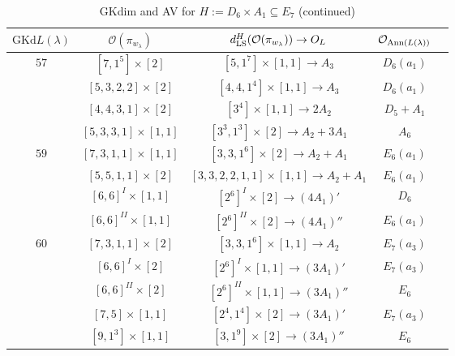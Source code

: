 \documentclass[reqno,12pt]{amsart}
\numberwithin{equation}{section}
\theoremstyle{plain}
\theoremstyle{definition}
\newcommand{\lam}{\lambda}
\renewcommand{\subset}{\subseteq}
\begin{document}
\begin{table}[htbp]\caption{ GKdim and AV for $H:=D_6\times A_1\subset E_7$ (continued)}
	\centering
	\renewcommand{\arraystretch}{1.5}
	\setlength\tabcolsep{5pt}
{	\begin{tabular}{|c|c|c|c|c|}
		\hline $\mathrm{GKd} L(\lambda)$ &   $\mathcal{O}({\pi_{w_{\lam}}})$& $d_{\rm LS}^{H}(\mathcal{O}(\pi_{w_\lambda}))\rightarrow O_{L}$ & $\mathcal{O}_{{\rm Ann}(L(\lambda))}$ \\ \hline

$57$ 
&  $ [7,1^5]\times [2]$  & \small{$[5,1^7]\times [1,1]\rightarrow  A_3$  }&   $D_6(a_1)$ \\
&  $ [5,3,2,2]\times [2]$  & \small{$[4,4,1^4]\times [1,1]\rightarrow A_3$  }&   $D_6(a_1)$ \\
&  $ [4,4,3,1]\times [2]$  & \small{$[3^4]\times [1,1]\rightarrow 2A_2$}&   $D_5+A_1$ \\

&  $ [5,3,3,1]\times [1,1]$  & \small{$[3^3,1^3]\times [2]\rightarrow A_2+3A_1$  }&   $A_6$ \\
\hline


  
$59$ 
&  $ [7,3,1,1]\times [1,1]$  & \small{$[3,3,1^6]\times [2]\rightarrow A_2+A_1$  }&   $E_6(a_1)$ \\
&  $ [5,5,1,1]\times [2]$  & \small{$[3,3,2,2,1,1]\times [1,1]\rightarrow A_2+A_1$  }&   $E_6(a_1)$ \\
& \small{  $ [6,6]^{I}\times [1,1]$} & \small{$[2^6]^I\times [2]\rightarrow (4A_1)'$}&   $D_6$ \\
& \small{   $ [6,6]^{II}\times [1,1]$ } & \small{$[2^6]^{II}\times [2]\rightarrow (4A_1)''$}&   $E_6(a_1)$ \\

\hline 

$60$ 
&  $ [7,3,1,1]\times [2]$  & \small{$[3,3,1^6]\times [1,1]\rightarrow A_2$  }&   $E_7(a_3)$ \\


& \small{ $ [6,6]^{I}\times [2]$} & \small{$[2^6]^{I}\times [1,1]\rightarrow (3A_1)'$ }&   $E_7(a_3)$ \\
& \small{   $ [6,6]^{II}\times [2]$} & \small{$[2^6]^{II}\times [1,1]\rightarrow (3A_1)''$}  &   $E_6$ \\

&  $ [7,5]\times [1,1]$  & \small{$[2^4,1^4]\times [2]\rightarrow (3A_1)'$  }&   $E_7(a_3)$ \\

&  $ [9,1^3]\times [1,1]$  & \small{$[3,1^9]\times [2]\rightarrow (3A_1)''$  }&   $E_6$ \\
\hline





\end{tabular}}
	\bigskip
	
	\label{tabd6a1-2}

\end{table}
\end{document}
